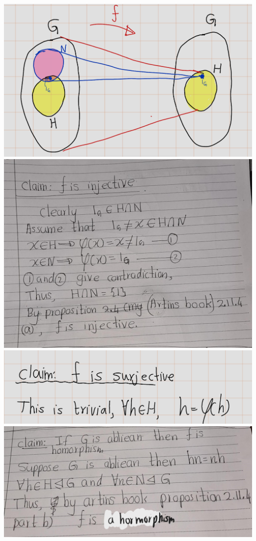 \documentclass[
]{book}
\begin{document}
\includegraphics{figures/ch_2/fig06.png}
\includegraphics{figures/ch_2/fig07.jpg}
\includegraphics{figures/ch_2/fig09.png}
\includegraphics{figures/ch_2/fig08.jpg}
\end{document}
